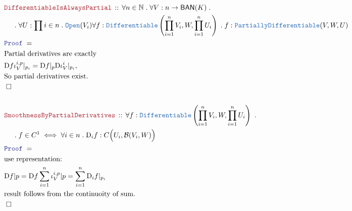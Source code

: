 \documentclass[12pt]{scrartcl}
\newcommand{\TYPE}[1]{\textcolor{NavyBlue}{\mathtt{#1}}}
\newcommand{\LOGIC}[1]{\textcolor{Blue}{\mathtt{#1}}}
\newcommand{\THM}[1]{\textcolor{Maroon}{\mathtt{#1}}}
\renewcommand{\.}{\; . \;}
\newcommand{\Theorem}[2]{& \THM{#1} \, :: \, #2 \\ & \Proof = \\ }
\newcommand{\NewLine}{\\ & \kern 1pc}
\newcommand{\Page}[1]{\begin{align*} #1 \end{align*}   }
\newcommand{\Nat}{\mathbb{N} }
\newcommand{\QED}{\; \square}
\newcommand{\EndProof}{& \QED \\}
\newcommand{\Proof}{\LOGIC{Proof} \; }
\newcommand{\BAN}{\mathsf{BAN}} %
\newcommand{\D}{\mathrm{D}}
\newcommand{\B}{\mathcal{B}}
\begin{document}
\Page{
	\Theorem{DifferentiableIsAlwaysPartial}{
		\forall n \in \Nat \.
		\forall V : n \to \BAN(K) \.
		\NewLine \.
		\forall U : \prod i \in n \. \TYPE{Open}(V_i)
		\forall f : \TYPE{Differentiable}\left( \prod^n_{i = 1} V_i,W, \prod^n_{i = 1} U_i  \right) \.
		f : \TYPE{PartiallyDifferentiable}(V,W,U) 
	}
	& \textrm{Partial derivatives are exactly }  \\
	&  \D f \iota^{i,p}_V |_{p_i}  = \D f |_p \D \iota^i_V |_{p_i}, \\
	& \textrm{So partial derivatives exist.} \\
	\EndProof
	\\
	\Theorem{SmoothnessByPartialDerivatives}{ \forall f : \TYPE{Differentiable}\left( \prod^n_{i=1} V_i,W,\prod^n_{i=1} U_i  \right)
		 \ . \NewLine 
		\.  f \in  C^1 \iff \forall i \in n \. \D_i f : C\Big(U_i,\B(V_i,W)\Big)
	}
	& \textrm{use representation:} \\
	&  \D f |p = \D f \sum^n_{i = 1} \iota^{i,p}_V |p = \sum^n_{i = 1} \D_i f |_{p_i} \\
	& \textrm{result follows from the continuoity of sum.} \\
	\EndProof
}
\newpage
\end{document}
